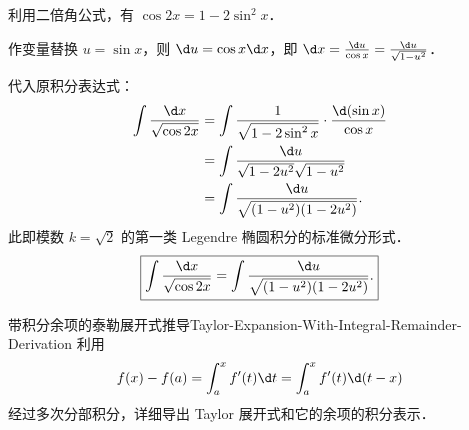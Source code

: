 \begin{solution}
    利用二倍角公式，有 $\cos 2x = 1 - 2\sin^2 x$．

    作变量替换 $u = \sin x$，则 $\d u = \cos x \d x$，即 $\d x = \frac{\d u}{\cos x} = \frac{\d u}{\sqrt{1 - u^2}}$．

    代入原积分表达式：
    \begin{equation}
        \begin{aligned}
            \int \frac{\d x}{\sqrt{\cos 2x}} & = \int \frac{1}{\sqrt{1 - 2\sin^2 x}} \cdot \frac{\d(\sin x)}{\cos x} \\
                                             & = \int \frac{\d u}{\sqrt{1 - 2u^2} \sqrt{1 - u^2}}                    \\
                                             & = \int \frac{\d u}{\sqrt{(1 - u^2)(1 - 2u^2)}}.
        \end{aligned}
    \end{equation}
    此即模数 $k = \sqrt{2}$ 的第一类 Legendre 椭圆积分的标准微分形式．
    \begin{equation}
        \boxed{\int \frac{\d x}{\sqrt{\cos 2x}} = \int \frac{\d u}{\sqrt{(1 - u^2)(1 - 2u^2)}}.}
    \end{equation}
\end{solution}

\begin{problem}{带积分余项的泰勒展开式推导}{Taylor-Expansion-With-Integral-Remainder-Derivation}
    利用
    \begin{equation}
        f(x) - f(a) = \int_a^x f'(t) \d t = \int_a^x f'(t) \d(t - x)
    \end{equation}
    经过多次分部积分，详细导出 Taylor 展开式和它的余项的积分表示．
\end{problem}

